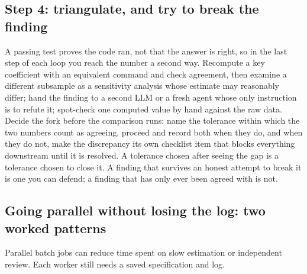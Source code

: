 \documentclass[
    a4paper,
    fontsize=10pt,
    twoside=true,
    numbers=noenddot,
]{kaobook}
\begin{document}
\subsection{Step 4: triangulate, and try to break the finding}
A passing test proves the code ran, not that the answer is right, so in the last step of each loop you reach the number a second way. Recompute a key coefficient with an equivalent command and check agreement, then examine a different subsample as a sensitivity analysis whose estimate may reasonably differ; hand the finding to a second LLM or a fresh agent whose only instruction is to refute it; spot-check one computed value by hand against the raw data. Decide the fork before the comparison runs: name the tolerance within which the two numbers count as agreeing, proceed and record both when they do, and when they do not, make the discrepancy its own checklist item that blocks everything downstream until it is resolved. A tolerance chosen after seeing the gap is a tolerance chosen to close it. A finding that survives an honest attempt to break it is one you can defend; a finding that has only ever been agreed with is not.

\subsection{Going parallel without losing the log: two worked patterns}\label{sec:backbone-parallel}
Parallel batch jobs can reduce time spent on slow estimation or independent review. Each worker still needs a saved specification and log.
\end{document}
